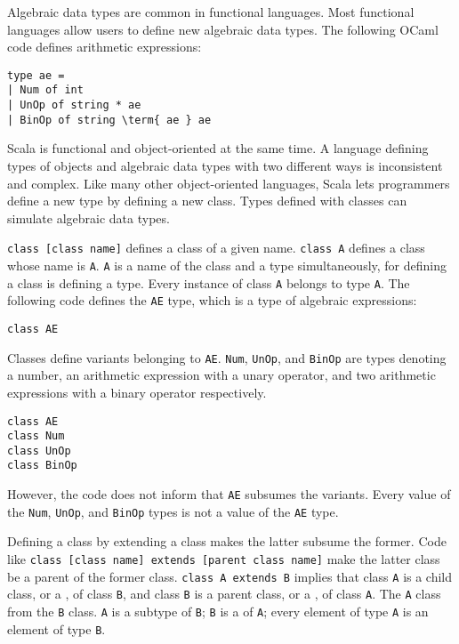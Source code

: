 Algebraic data types are common in functional languages. Most functional
languages allow users to define new algebraic data types. The following OCaml
code defines arithmetic expressions:

\begin{verbatim}
type ae =
| Num of int
| UnOp of string * ae
| BinOp of string \term{ ae } ae
\end{verbatim}

Scala is functional and object-oriented at the same time. A language defining
types of objects and algebraic data types with two different ways is inconsistent
and complex. Like many other object-oriented languages, Scala lets programmers
define a new type by defining a new class. Types defined with classes can
simulate algebraic data types.

\verb!class [class name]! defines a class of a given name. \verb!class A! defines
a class whose name is \verb!A!. \verb!A! is a name of the class and a type
simultaneously, for defining a class is defining a type. Every instance of class
\verb!A! belongs to type \verb!A!. The following code defines the \verb!AE! type,
which is a type of algebraic expressions:

\begin{verbatim}
class AE
\end{verbatim}

Classes define variants belonging to \verb!AE!. \verb!Num!, \verb!UnOp!, and
\verb!BinOp! are types denoting a number, an arithmetic expression with a unary
operator, and two arithmetic expressions with a binary operator respectively.

\begin{verbatim}
class AE
class Num
class UnOp
class BinOp
\end{verbatim}

However, the code does not inform that \verb!AE! subsumes the variants. Every
value of the \verb!Num!, \verb!UnOp!, and \verb!BinOp! types is not a value of
the \verb!AE! type.

Defining a class by extending a class makes the latter subsume the former. Code
like \verb!class [class name] extends [parent class name]! make the latter class
be a parent of the former class. \verb!class A extends B! implies that class
\verb!A! is a child class, or a , of class \verb!B!, and class
\verb!B! is a parent class, or a , of class \verb!A!. The
\verb!A! class  from the \verb!B! class. \verb!A! is a subtype of
\verb!B!; \verb!B! is a  of \verb!A!; every element of type
\verb!A! is an element of type \verb!B!.

